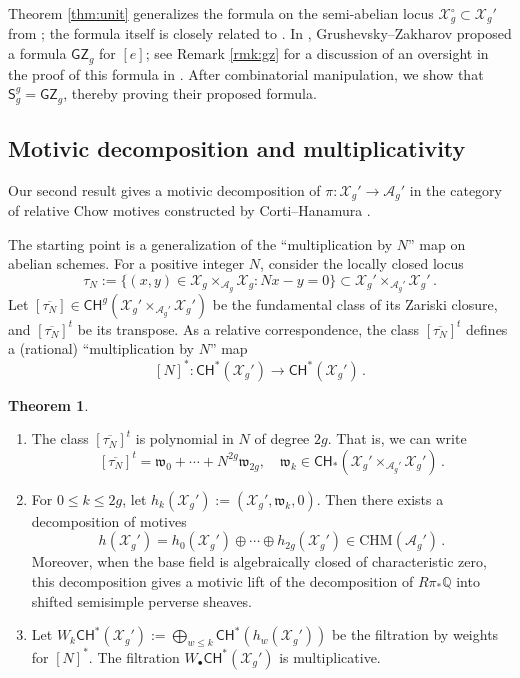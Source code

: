 \documentclass[11pt]{article}
\def\CH{\mathsf{CH}}
\def\A{\mathcal{A}}
\def\X{\mathcal{X}}
\def\QQ{\mathbb{Q}}
\newcommand{\CHM}{\mathrm{CHM}}
\newcommand{\sfS}{\mathsf{S}}
\newcommand{\w}{\mathfrak{w}}
\theoremstyle{definition}
\newtheorem{theoremintro}{Theorem}
\begin{document}
Theorem \ref{thm:unit} generalizes the formula on the semi-abelian locus $\X_g^\circ \subset \X_g'$ from \cite{BMP}; the formula itself is closely related to \cite{BHPSS}.
In \cite{GZ}, Grushevsky--Zakharov proposed a formula $\mathsf{GZ}_g$ for $[e]$; see Remark \ref{rmk:gz} for a discussion of an oversight in the proof of this formula in \cite{GZ}. After combinatorial manipulation, we show that $\sfS_g^g = \mathsf{GZ}_g$, thereby proving their proposed formula.

\subsection{Motivic decomposition and multiplicativity}

Our second result gives a motivic decomposition of $\pi : \X_g' \to \A_g'$ in the category of relative Chow motives constructed by Corti--Hanamura \cite{CortiHanamura}.

The starting point is a generalization of the ``multiplication by $N$'' map on abelian schemes. For a positive integer $N$, consider the locally closed locus
\[
\tau_N := \{(x,y) \in \X_g\times_{\A_g}\X_g : Nx-y=0\} \subset \X_g'\times_{\A_g'} \X_g'\,.
\]
Let $[\overline{\tau_N}] \in \CH^g(\X_g' \times_{\A_g'}\X_g')$ be the fundamental class of its Zariski closure, and $[\overline{\tau_N}]^t$ be its transpose. As a relative correspondence, the class $[\overline{\tau_N}]^t$ defines a (rational) ``multiplication by $N$'' map
\begin{equation}\label{eq:intro_n}
    [N]^* : \CH^*(\X_g') \to \CH^*(\X_g')\,.
\end{equation}


\begin{theoremintro}\label{thm:dec}
    \begin{enumerate}[label = (\alph*)]
        \item The class $[\overline{\tau_N}]^t$ is polynomial in $N$ of degree $2g$. That is, we can write
        \[
        [\overline{\tau_N}]^t = \w_0 + \cdots + N^{2g}\w_{2g}, \quad \w_k \in \CH_*(\X_g'\times_{\A_g'}\X_g')\,.
        \]
        \item For $0\leq k \leq 2g$, let $h_k(\X_g') := (\X_g', \w_k,0)$. Then there exists a decomposition of motives
        \[
        h(\X_g') = h_0(\X_g') \oplus \cdots \oplus h_{2g}(\X_g') \in \CHM(\A_g')\,.
        \]
		Moreover, when the base field is algebraically closed of characteristic zero, this decomposition gives a motivic lift of the decomposition of $R\pi_* \QQ$ into shifted semisimple perverse sheaves.
        \item Let $W_k \CH^*(\X_g'):= \bigoplus_{w\leq k} \CH^*(h_w(\X_g'))$ be the filtration by weights for $[N]^*$. The filtration $W_\bullet\CH^*(\X_g')$ is multiplicative.
    \end{enumerate}
\end{theoremintro}
\end{document}
